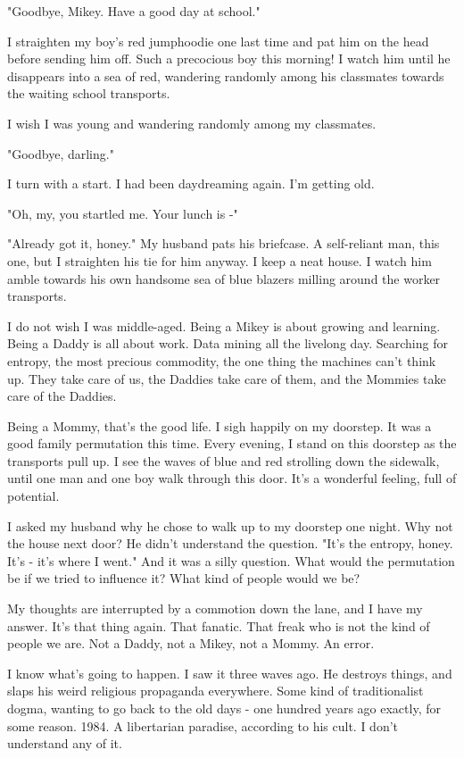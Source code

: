 \documentclass{amsbook}
\begin{document}
"Goodbye, Mikey.  Have a good day at school."

I straighten my boy's red jumphoodie one last time and pat him on the head before sending him off.  Such a precocious boy this morning!  I watch him until he disappears into a sea of red, wandering randomly among his classmates towards the waiting school transports.

I wish I was young and wandering randomly among my classmates.

"Goodbye, darling."

I turn with a start.  I had been daydreaming again.  I'm getting old.

"Oh, my, you startled me.  Your lunch is -"

"Already got it, honey."  My husband pats his briefcase.  A self-reliant man, this one, but I straighten his tie for him anyway.  I keep a neat house.  I watch him amble towards his own handsome sea of blue blazers milling around the worker transports.

I do not wish I was middle-aged.  Being a Mikey is about growing and learning.  Being a Daddy is all about work.  Data mining all the livelong day.  Searching for entropy, the most precious commodity, the one thing the machines can't think up.  They take care of us, the Daddies take care of them, and the Mommies take care of the Daddies.

Being a Mommy, that's the good life.  I sigh happily on my doorstep.  It was a good family permutation this time.  Every evening, I stand on this doorstep as the transports pull up.  I see the waves of blue and red strolling down the sidewalk, until one man and one boy walk through this door.  It's a wonderful feeling, full of potential.

I asked my husband why he chose to walk up to my doorstep one night. Why not the house next door?  He didn't understand the question.  "It's the entropy, honey.  It's - it's where I went."  And it was a silly question.  What would the permutation be if we tried to influence it?  What kind of people would we be?

My thoughts are interrupted by a commotion down the lane, and I have my answer.  It's that thing again.  That fanatic.  That freak who is not the kind of people we are.  Not a Daddy, not a Mikey, not a Mommy.  An error.

I know what's going to happen.  I saw it three waves ago.  He destroys things, and slaps his weird religious propaganda everywhere.  Some kind of traditionalist dogma, wanting to go back to the old days - one hundred years ago exactly, for some reason.  1984.  A libertarian paradise, according to his cult.  I don't understand any of it.
\end{document}
